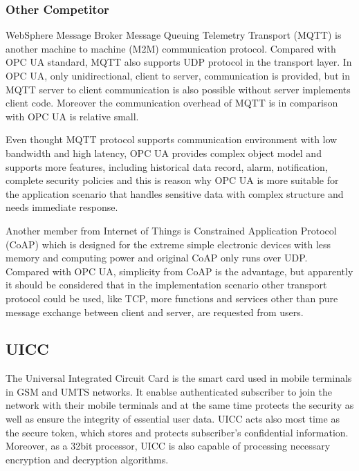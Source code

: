 \documentclass[]{llncs}
\begin{document}
\subsubsection{Other Competitor}
WebSphere Message Broker Message Queuing Telemetry Transport (MQTT)\cite{Ref3} is another machine to machine (M2M) communication protocol. Compared with OPC UA standard, MQTT also supports UDP protocol in the transport layer. In OPC UA, only unidirectional, client to server, communication is provided, but in MQTT server to client communication is also possible without server implements client code. Moreover the communication overhead of MQTT is in comparison with OPC UA is relative small. 


Even thought MQTT protocol supports communication environment with low bandwidth and high latency, OPC UA provides complex object model and supports more features, including historical data record, alarm, notification, complete security policies and this is reason why OPC UA is more suitable for the application scenario that handles sensitive data with complex structure and needs immediate response.


Another member from Internet of Things is Constrained Application Protocol (CoAP)\cite{Ref5} which is designed for the extreme simple electronic devices with less memory and computing power and original CoAP only runs over UDP. Compared with OPC UA, simplicity from CoAP is the advantage, but apparently it should be considered that in the implementation scenario other transport protocol could be used, like TCP, more functions and services other than pure message exchange between client and server, are requested from users.

\subsection{UICC}
The Universal Integrated Circuit Card is the smart card used in mobile terminals in GSM and UMTS networks. It enablse authenticated subscriber to join the network with their mobile terminals and at the same time protects the security as well as ensure the integrity of essential user data. UICC acts  also most time as the secure token, which stores and protects subscriber's confidential information. Moreover, as a 32bit processor, UICC is also capable of processing necessary  encryption and  decryption algorithms\cite{uiccDef}.
\end{document}
